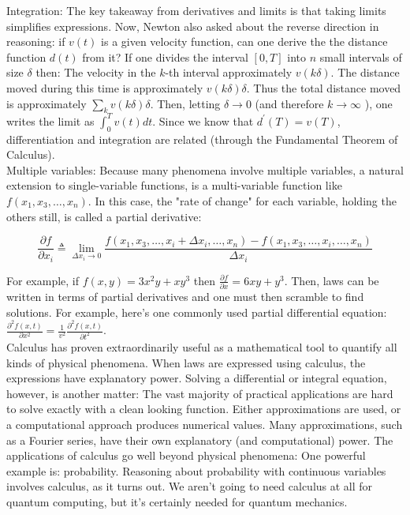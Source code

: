 \documentclass[main.tex]{subfiles}
\begin{document}
Integration: The key takeaway from derivatives and limits is that taking limits simplifies expressions. Now, Newton also asked about the reverse direction in reasoning: if $v(t)$ is a given velocity function, can one derive the the distance function $d(t)$ from it? If one divides the interval $[0, T]$ into $n$ small intervals of size $\delta$ then: The velocity in the $k$-th interval approximately $v(k \delta)$. The distance moved during this time is approximately $v(k \delta) \delta$. Thus the total distance moved is approximately $\sum_{k} v(k \delta) \delta$. Then, letting $\delta \rightarrow 0$ (and therefore $k \rightarrow \infty$ ), one writes the limit as $\int_{0}^{T} v(t) d t$. Since we know that $d^{\prime}(T)=v(T)$, differentiation and integration are related (through the Fundamental Theorem of Calculus).\\

Multiple variables: Because many phenomena involve multiple variables, a natural extension to single-variable functions, is a multi-variable function like $f\left(x_{1}, x_{3}, \ldots, x_{n}\right)$. In this case, the "rate of change" for each variable, holding the others still, is called a partial derivative: 

$$\frac{\partial f}{\partial x_{i}} \triangleq \lim _{\Delta x_{i} \rightarrow 0} \frac{f\left(x_{1}, x_{3}, \ldots, x_{i}+\Delta x_{i}, \ldots, x_{n}\right)-f\left(x_{1}, x_{3}, \ldots, x_{i}, \ldots, x_{n}\right)}{\Delta x_{i}}$$ 

For example, if $f(x, y)=3 x^{2} y+x y^{3}$ then $\frac{\partial f}{\partial x}=6 x y+y^{3}$. Then, laws can be written in terms of partial derivatives and one must then scramble to find solutions. For example, here's one commonly used partial differential equation:$
\frac{\partial^{2} f(x, t)}{\partial x^{2}}=\frac{1}{v^{2}} \frac{\partial^{2} f(x, t)}{\partial t^{2}}$.\\

Calculus has proven extraordinarily useful as a mathematical tool to quantify all kinds of physical phenomena. When laws are expressed using calculus, the expressions have explanatory power. Solving a differential or integral equation, however, is another matter: The vast majority of practical applications are hard to solve exactly with a clean looking function. Either approximations are used, or a computational approach produces numerical values. Many approximations, such as a Fourier series, have their own explanatory (and computational) power. The applications of calculus go well beyond physical phenomena: One powerful example is: probability. Reasoning about probability with continuous variables involves calculus, as it turns out. We aren't going to need calculus at all for quantum computing, but it's certainly needed for quantum mechanics.
\end{document}
